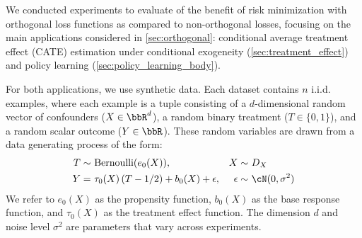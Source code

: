\documentclass[11pt]{article} %
\newcommand{\pref}[1]{\cref{#1}}
\theoremstyle{theorem}  %
\theoremstyle{plain}
\newcommand{\R}{\bbR}
\begin{document}
We conducted experiments to evaluate of the benefit of risk minimization with orthogonal loss functions as compared to non-orthogonal losses, focusing on the main applications considered in \pref{sec:orthogonal}: conditional average treatment effect (CATE) estimation under conditional exogeneity (\pref{sec:treatment_effect}) and policy learning (\pref{sec:policy_learning_body}).

%

For both applications, we use synthetic data. Each dataset contains $n$ i.i.d. examples, where each example is a tuple consisting of a $d$-dimensional random vector of confounders ($X\in \R^d$), a random binary treatment ($T\in \{0, 1\}$), and a random scalar outcome ($Y\in \R$). These random variables are drawn from a data generating process of the form:
\begin{align}
  \begin{aligned}
    T \sim~& \text{Bernoulli}(e_0(X)),& X \sim~& D_X\\
    Y =~& \tau_0(X)\, (T - 1/2) + b_0(X) + \epsilon,& \epsilon \sim~& \cN(0, \sigma^2)
  \end{aligned}\label{eq:exp_dgp}
\end{align}
We refer to $e_0(X)$ as the propensity function, $b_0(X)$ as the base response function, and $\tau_0(X)$ as the treatment effect function. The dimension $d$ and noise level $\sigma^2$ are parameters that vary across experiments.
%
\end{document}
